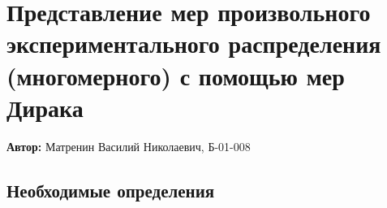
\newcommand{\formula}[2]
{
    \begin{equation}\label{#1}
        #2
    \end{equation}
}

\newcommand{\defHead}[2]
{
    {\bf\large Определение: #1} \\ $ [ $ Источник: #2 $ ] $ \\
}

\newcommand{\thHead}[2]
{
    {\bf\large Теорема: #1} \\ $ [ $ Источник: #2 $ ] $ \\
}

\newcommand{\refShamarovLecture}[1]
{
    Лекции Н.Н. Шамарова по ДСП в МФТИ, 2023. Лекция \textnumero #1
}

\newcommand{\refShiryaevBook}[1]
{
    А.Н. Ширяев, \guillemotleft Вероятность - 1 \guillemotright, стр. #1.
}

\setcounter{PicsCounter}{1}

\newcommand{\pic}[3]{
    \begin{center}
        \begin{minipage}[h!]{#1}
            \begin{center}

                \texttt{[image: \#2]}
                \textit{Рис \arabic{PicsCounter}. #3}

            \end{center}
        \end{minipage}
    \end{center}

    \stepcounter{PicsCounter}
}

\setcounter{TablesCounter}{1}

\newcommand{\tableLable}[1]{
    \textit{Таблица \arabic{TablesCounter}: #1}

    \stepcounter{TablesCounter}
}

\newcommand{\defeq}{\stackrel{\text{def}}{=}}

\section{Представление мер произвольного экспериментального распределения (многомерного) с помощью мер Дирака}

\textbf{Автор:} Матренин Василий Николаевич, Б-01-008

\subsection{Необходимые определения}

